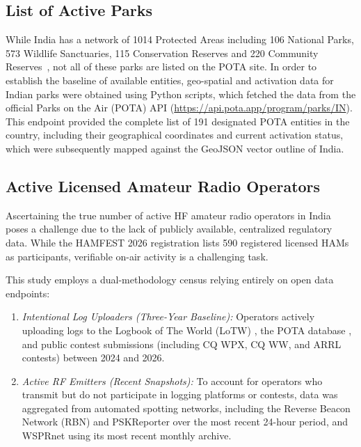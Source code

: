 \documentclass[conference]{IEEEtran}
\begin{document}
\subsection{List of Active Parks}
While India has a network of 1014 Protected Areas including 106
National Parks, 573 Wildlife Sanctuaries, 115 Conservation Reserves
and 220 Community Reserves~\cite{b10}, not all of these parks are
listed on the POTA site. In order to establish the baseline of
available entities, geo-spatial and activation data for Indian parks
were obtained using Python scripts, which fetched the data from the
official Parks on the Air (POTA) API
(\url{https://api.pota.app/program/parks/IN}). This endpoint provided
the complete list of 191 designated POTA entities in the country,
including their geographical coordinates and current activation
status, which were subsequently mapped against the GeoJSON vector
outline of India.

\subsection{Active Licensed Amateur Radio Operators}
Ascertaining the true number of active HF amateur radio operators in
India poses a challenge due to the lack of publicly available,
centralized regulatory data. While the HAMFEST 2026 registration lists
590 registered licensed HAMs~\cite{b2} as participants, verifiable
on-air activity is a challenging task.

This study employs a dual-methodology census relying entirely on open
data endpoints:
\begin{enumerate}
    \item \textit{Intentional Log Uploaders (Three-Year Baseline):}
      Operators actively uploading logs to the Logbook of The World
      (LoTW) \cite{b4}, the POTA database \cite{b3}, and public
      contest submissions (including CQ WPX, CQ WW, and ARRL contests)
      \cite{b5} between 2024 and 2026.
    \item \textit{Active RF Emitters (Recent Snapshots):} To account
      for operators who transmit but do not participate in logging
      platforms or contests, data was aggregated from automated
      spotting networks, including the Reverse Beacon Network (RBN)
      \cite{b6} and PSKReporter \cite{b11} over the most recent
      24-hour period, and WSPRnet \cite{b12} using its most recent
      monthly archive.
    \end{enumerate}
\end{document}
